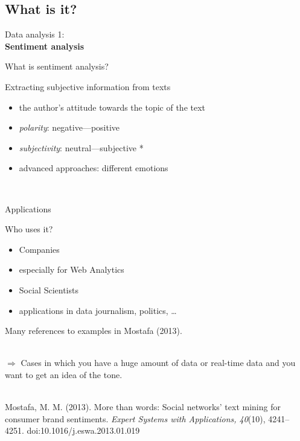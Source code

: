 \documentclass{beamer}
\begin{document}
\subsection{What is it?}
\begin{frame}
Data analysis 1:\\
\textbf{Sentiment analysis}
\end{frame}


\begin{frame}{What is sentiment analysis?}
\begin{block}{Extracting subjective information from texts}
\begin{itemize}
\item<2->  the author's attitude towards the topic of the text
\item<3-> \emph{polarity}: negative---positive
\item<4-> \emph{subjectivity}: neutral---subjective *
\item<5-> advanced approaches: different emotions
\end{itemize}
~\\ 
\footnotesize{
}
\end{block}
\end{frame}



\begin{frame}{Applications}
\begin{block}{Who uses it?}
\begin{itemize}
\item Companies
\item especially for Web Analytics
\item Social Scientists
\item applications in data journalism, politics, \ldots
\end{itemize}
Many references to examples in Mostafa (2013).
\end{block}
~\\
$\Rightarrow$ Cases in which you have a huge amount of data or real-time data and you want to get an idea of the tone. \\ ~
\par
\tiny{Mostafa, M. M. (2013). More than words: Social networks’ text mining for consumer brand sentiments. \emph{Expert Systems with Applications, 40}(10), 4241– 4251. doi:10.1016/j.eswa.2013.01.019}\\
\end{frame}
\end{document}
